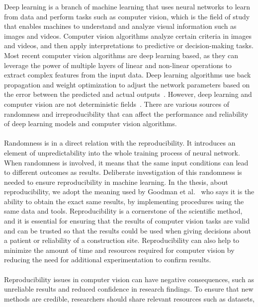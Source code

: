 Deep learning is a branch of machine learning that uses neural networks to learn from
data and perform tasks such as computer vision, which is the field of study that enables 
machines to understand and analyze visual information such as images and videos.
Computer vision algorithms analyze certain criteria in images and videos, and then
apply interpretations to predictive or decision-making tasks. Most recent computer 
vision algorithms are deep learning based, as they can leverage the power of multiple
layers of linear and non-linear operations to extract complex features from the input
data. Deep learning algorithms use back propagation and weight optimization to adjust
the network parameters based on the error between the predicted and actual outputs~\cite{testwebsite}.
However, deep learning and computer vision are not deterministic fields~\cite{zhuang2022randomness}. There are
various sources of randomness and irreproducibility that can affect the performance 
and reliability of deep learning models and computer vision algorithms.
\\
\\
Randomness is in a direct relation with the reproducibility. It introduces an element of unpredictability into the whole training process
of neural network. When randomness is involved, it means that the same input
conditions can lead to different outcomes as results. Deliberate investigation
of this randomness is needed to ensure reproducibility in machine learning. In the thesis, about reproducibility,
we adopt the meaning used by Goodman et al.~\cite{goodman:2016ca} who says it is the ability to obtain the exact same results, by implementing procedures using the same data
and tools. Reproducibility is a cornerstone of the scientific method, and it is essential for ensuring that the results
of computer vision tasks are valid and can be trusted so that the results could be used when giving decisions
about a patient or reliability of a construction site. Reproducibility can also help to minimize the amount of time and
resources required for computer vision by reducing the need for additional experimentation to confirm
results.
\\
\\
Reproducibility issues in computer vision can have negative consequences, 
such as unreliable results and reduced confidence in research findings. 
To ensure that new methods are credible, researchers should share relevant resources such as datasets, 
